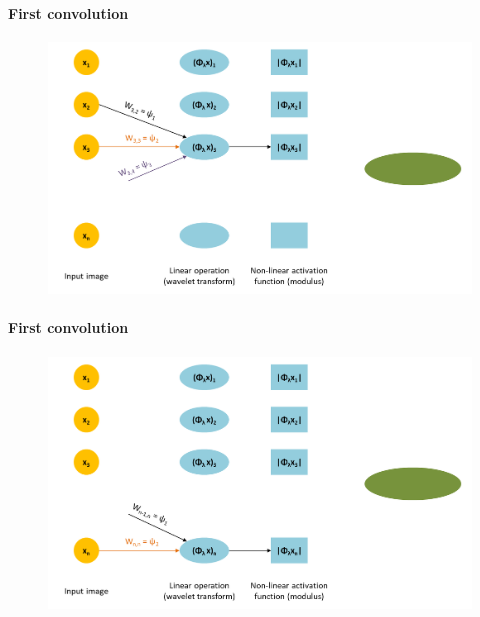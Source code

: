 \documentclass[10pt]{beamer}
\begin{document}
\begin{darkframes}
    \begin{frame}{\subsecname}
    \framesubtitle{First convolution}
    \begin{figure}
        \centering
        \includegraphics[width=\textwidth]{resources/convolution/CNN3.png}
    \end{figure}
    \end{frame}
    
    \begin{frame}{\subsecname}
    \framesubtitle{First convolution}
    \begin{figure}
        \centering
        \includegraphics[width=\textwidth]{resources/convolution/CNN4.png}
    \end{figure}
    \end{frame}
    

\end{darkframes}
\end{document}
